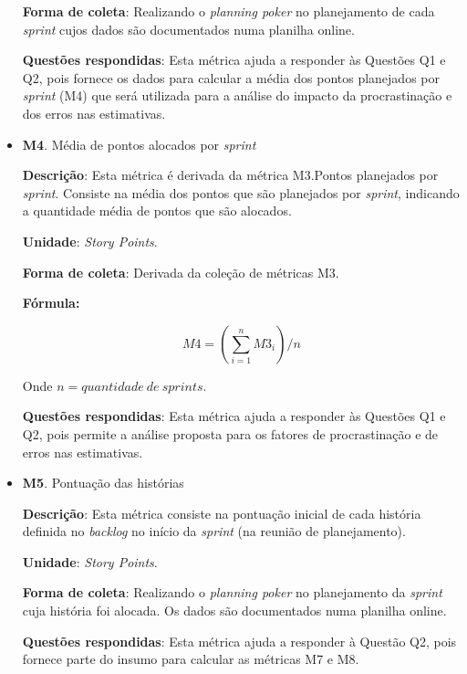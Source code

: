 \begin{itemize}
	   \subitem \textbf{Forma de coleta}: Realizando o \textit{planning poker} no planejamento de cada \textit{sprint} 
		    cujos dados são documentados numa planilha online.
	   
	   \subitem \textbf{Questões respondidas}: Esta métrica ajuda a responder às Questões Q1 e Q2, pois fornece os dados para
		    calcular a média dos pontos planejados por \textit{sprint} (M4) que será utilizada para a análise do impacto 
		    da procrastinação e dos erros nas estimativas.
	  
	 \item \textbf{M4}. Média de pontos alocados por \textit{sprint}
	 
	   \subitem \textbf{Descrição}: Esta métrica é derivada da métrica M3.Pontos planejados por \textit{sprint}.
		    Consiste na média dos pontos que são planejados por \textit{sprint}, indicando a quantidade média 
		    de pontos que são alocados.
	   
	   \subitem \textbf{Unidade}: \textit{Story Points}.
	   
	   \subitem \textbf{Forma de coleta}: Derivada da coleção de métricas M3.
	   
	      \subsubitem \textbf{Fórmula:} 
	      
		$$ M4 = (\sum\limits_{i=1}^{n}M3_i)/n $$
		
	      \subsubitem Onde $n = quantidade\ de\ sprints$.
	   
	   \subitem \textbf{Questões respondidas}: Esta métrica ajuda a responder às Questões Q1 e Q2, pois permite a análise 
		    proposta para os fatores de procrastinação e de erros nas estimativas.
	 
	 \item \textbf{M5}. Pontuação das histórias
	  
	   \subitem \textbf{Descrição}: Esta métrica consiste na pontuação inicial de cada história definida no \textit{backlog} no início
		    da \textit{sprint} (na reunião de planejamento).
	   
	   \subitem \textbf{Unidade}: \textit{Story Points}.
	   
	   \subitem \textbf{Forma de coleta}: Realizando o \textit{planning poker} no planejamento da \textit{sprint}
		    cuja história foi alocada. Os dados são documentados numa planilha online.
	   
	   \subitem \textbf{Questões respondidas}: Esta métrica ajuda a responder à Questão Q2, pois fornece parte do insumo para calcular 
		    as métricas M7 e M8. 
		    

\end{itemize}

